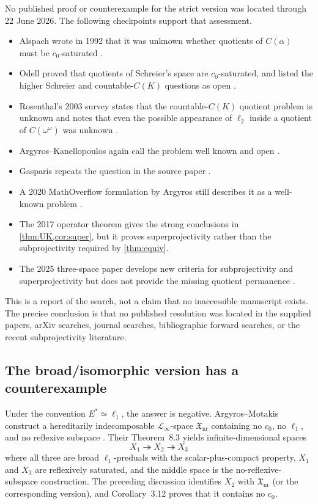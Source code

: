 \documentclass[11pt]{article}
\theoremstyle{definition}
\newcommand{\onto}{\twoheadrightarrow}
\newcommand{\isom}{\simeq}
\begin{document}
No published proof or counterexample for the strict version was located
through 22 June 2026.  The following checkpoints support that assessment.

\begin{itemize}
\item Alspach wrote in 1992 that it was unknown whether quotients of
      $C(\alpha)$ must be $c_0$-saturated \cite{Alspach1993}.
\item Odell proved that quotients of Schreier's space are $c_0$-saturated,
      and listed the higher Schreier and countable-$C(K)$ questions as open
      \cite{Odell1992}.
\item Rosenthal's 2003 survey states that the countable-$C(K)$ quotient
      problem is unknown and notes that even the possible appearance of
      $\ell_2$ inside a quotient of $C(\omega^\omega)$ was unknown
      \cite{Rosenthal2003}.
\item Argyros--Kanellopoulos again call the problem well known and open
      \cite[Remark~4]{ArgyrosKanellopoulos2005}.
\item Gasparis repeats the question in the source paper
      \cite[p.~492]{Gasparis2009}.
\item A 2020 MathOverflow formulation by Argyros still describes it as a
      well-known problem \cite{MathOverflow2020}.
\item The 2017 operator theorem gives the strong conclusions in
      \cref{thm:UK,cor:super}, but it proves superprojectivity rather than the
      subprojectivity required by \cref{thm:equiv}.
\item The 2025 three-space paper develops new criteria for subprojectivity
      and superprojectivity but does not provide the missing quotient
      permanence \cite{GonzalezPello2025}.
\end{itemize}

This is a report of the search, not a claim that no inaccessible manuscript
exists.  The precise conclusion is that no published resolution was located
in the supplied papers, arXiv searches, journal searches, bibliographic
forward searches, or the recent subprojectivity literature.

\subsection{The broad/isomorphic version has a counterexample}

Under the convention $E^*\isom\ell_1$, the answer is negative.
Argyros--Motakis construct a hereditarily indecomposable
$\mathcal L_\infty$-space $\mathfrak X_{\mathrm{nr}}$ containing no $c_0$, no
$\ell_1$, and no reflexive subspace \cite{ArgyrosMotakis2016}.  Their
Theorem~8.3 yields infinite-dimensional spaces
\[
    X_1\onto X_2\onto X_3
\]
where all three are broad $\ell_1$-preduals with the scalar-plus-compact
property, $X_1$ and $X_3$ are reflexively saturated, and the middle space is
the no-reflexive-subspace construction.  The preceding discussion identifies
$X_2$ with $\mathfrak X_{\mathrm{nr}}$ (or the corresponding version), and
Corollary~3.12 proves that it contains no $c_0$.
\end{document}
